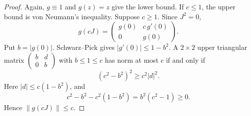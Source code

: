 \documentclass[11pt]{article}
\theoremstyle{remark}
\begin{document}
\begin{proof}
Again, \(g\equiv1\) and \(g(z)=z\) give the lower bound.  If
\(c\leq1\), the upper bound is von Neumann's inequality.  Suppose
\(c\geq1\).  Since \(J^2=0\),
\[
  g(cJ)=
  \begin{pmatrix}
    g(0)&c\,g'(0)\\
    0&g(0)
  \end{pmatrix}.
\]
Put \(b=|g(0)|\).  Schwarz--Pick gives
\(|g'(0)|\leq1-b^2\).  A \(2\times2\) upper triangular matrix
\(\left(\begin{smallmatrix}b&d\\0&b\end{smallmatrix}\right)\)
with \(b\leq1\leq c\) has norm at most \(c\) if and only if
\[
  (c^2-b^2)^2\geq c^2|d|^2.
\]
Here \(|d|\leq c(1-b^2)\), and
\[
  c^2-b^2-c^2(1-b^2)=b^2(c^2-1)\geq0.
\]
Hence \(\|g(cJ)\|\leq c\).
\end{proof}
\end{document}
